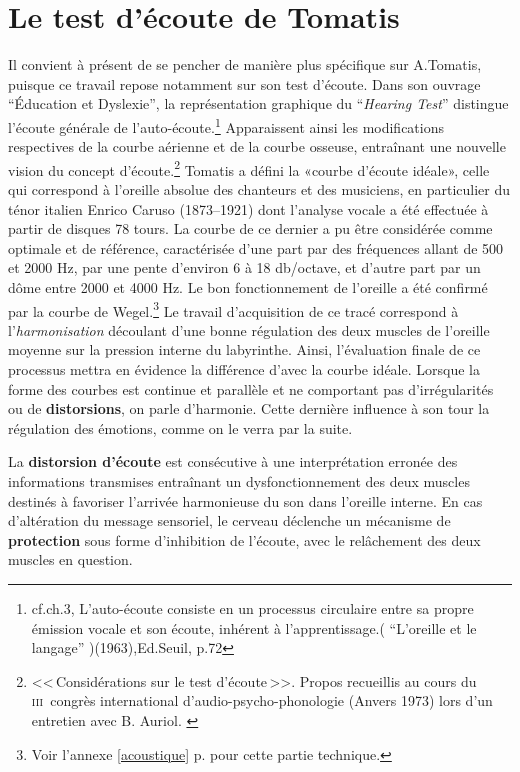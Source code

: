 
\section{Le test d'écoute de Tomatis}

Il convient à présent de se pencher de manière plus spécifique sur
A.Tomatis, puisque ce travail repose notamment sur son test d'écoute.
Dans son ouvrage ``Éducation et
    Dyslexie''\autocite{tomatis:education}, la représentation graphique du 
 ``\emph{Hearing Test}'' distingue l'écoute générale de
 l'auto-écoute.\footnote{cf.ch.3, L'auto-écoute consiste en un processus
   circulaire entre sa propre  émission vocale et son écoute, inhérent
   à l'apprentissage.( ``L'oreille et le langage'' )(1963),Ed.Seuil,
   p.72}
 Apparaissent ainsi les modifications respectives
 de la courbe aérienne et de la courbe osseuse, entraînant une nouvelle vision
 du concept d'écoute.\footnote{<<\,Considérations sur le test d'écoute\,>>. Propos
  	recueillis au cours du \textsc{iii}\ieme\ congrès international
  	d'audio-psycho-phonologie (Anvers 1973) lors d'un entretien
        avec B. Auriol. \autocite{auriol_stress}}
Tomatis a défini la «courbe d'écoute idéale», celle qui correspond à l'oreille absolue
des chanteurs et des musiciens, en particulier du ténor italien Enrico
Caruso (1873--1921) dont l'analyse vocale a été effectuée à partir de
disques 78 tours. La courbe de ce dernier a pu être considérée comme
optimale et de référence, caractérisée d'une part par des fréquences allant de 500 et 2000
Hz, par une pente d\textquoteright environ 6 à 18 db/octave,
et d'autre part par un dôme entre 2000 et 4000 Hz.
Le bon fonctionnement de l'oreille a été confirmé par la courbe
de Wegel.\footnote{
		Voir l'annexe \ref{acoustique} p. \pageref{acoustique}
		 pour cette partie technique.}
 Le travail d'acquisition de ce tracé correspond à l'\textsl{harmonisation}
découlant d'une bonne régulation des deux muscles de l'oreille moyenne
sur la pression interne du
labyrinthe.
Ainsi, l'évaluation finale de ce processus mettra en évidence la différence
d'avec la courbe idéale.
Lorsque la forme des 
courbes est continue et parallèle et ne comportant pas d'irrégularités ou
de \textbf{distorsions}, on parle d'harmonie.
Cette dernière influence à son tour 
la régulation des émotions, comme on le verra par la suite.



La \textbf{distorsion d'écoute} est consécutive à une interprétation
erronée des informations transmises entraînant un dysfonctionnement
des deux muscles destinés à favoriser l'arrivée
harmonieuse du son dans l'oreille interne.
En cas d'altération du message sensoriel,
le cerveau déclenche un mécanisme de\textbf{ protection} sous forme
d'inhibition de l'écoute, avec le relâchement des deux muscles en
question.


